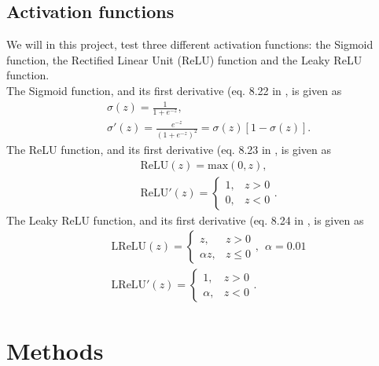 \documentclass[reprint,english,notitlepage, floatfix]{revtex4-2}  %
\begin{document}
\subsection{Activation functions}\label{subsec: act_funcs}

    We will in this project, test three different activation functions: the Sigmoid function, the Rectified Linear Unit (ReLU) function and the Leaky ReLU function. \\
    The Sigmoid function, and its first derivative (eq. 8.22 in \cite{lecture_book}, is given as 
    \begin{align}\label{eq: Sigmoid function}
        & \sigma (z) = \frac{1}{1 + e^{-z}},\\
        & \sigma '(z) = \frac{e^{-z}}{\left(1 + e^{-z}\right)^2} = \sigma(z) \left[1 - \sigma(z)\right]. \label{eq:sigmoid_der}
    \end{align}
    The ReLU function, and its first derivative (eq. 8.23 in \cite{lecture_book}, is given as
    \begin{align}\label{eq: ReLU function}
        & \text{ReLU}(z) = \text{max} (0, z),\\
        & \text{ReLU}'(z) = 
        \begin{cases}
            1, & z > 0 \\
            0, & z < 0 \label{eq: relu_der}
        \end{cases}.
    \end{align}
    The Leaky ReLU function, and its first derivative (eq. 8.24 in \cite{lecture_book}, is given as
    \begin{align}\label{eq: LeakyReLU_function}
        & \text{LReLU}(z) = 
        \begin{cases}
            z, & z > 0 \\
            \alpha z, & z \leq 0
        \end{cases}, \: \: \alpha = 0.01\\
        & \text{LReLU}'(z) = 
        \begin{cases}
            1, & z > 0 \\
            \alpha, & z < 0 \label{eq: leakyrelu_der}
        \end{cases}.
    \end{align}
    

\section{Methods}\label{sec: Methods}
\end{document}
